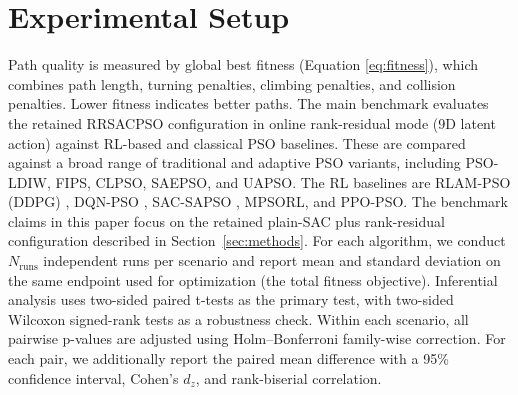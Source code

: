 \documentclass[final,5p,times]{elsarticle}
\newcommand{\symNumruns}{N_{\text{runs}}}
\begin{document}
\section{Experimental Setup}
\label{sec:experimental_setup}
Path quality is measured by global best fitness (Equation \ref{eq:fitness}), which combines path length, turning penalties, climbing penalties, and collision penalties.
Lower fitness indicates better paths.
The main benchmark evaluates the retained RRSACPSO configuration in online rank-residual mode (9D latent action) against RL-based and classical PSO baselines.
These are compared against a broad range of traditional and adaptive PSO variants, including PSO-LDIW, FIPS, CLPSO, SAEPSO, and UAPSO.
The RL baselines are RLAM-PSO (DDPG) \cite{Yin2023RLAMPSO}, DQN-PSO \cite{Aoun2024Deep}, SAC-SAPSO \cite{vonEschwege2024Soft}, MPSORL, and PPO-PSO.
The benchmark claims in this paper focus on the retained plain-SAC plus rank-residual configuration described in Section~\ref{sec:methods}.
For each algorithm, we conduct $\symNumruns$ independent runs per scenario and report mean and standard deviation on the same endpoint used for optimization (the total fitness objective).
Inferential analysis uses two-sided paired t-tests as the primary test, with two-sided Wilcoxon signed-rank tests as a robustness check.
Within each scenario, all pairwise p-values are adjusted using Holm--Bonferroni family-wise correction.
For each pair, we additionally report the paired mean difference with a 95\% confidence interval, Cohen's $d_z$, and rank-biserial correlation.
\end{document}

